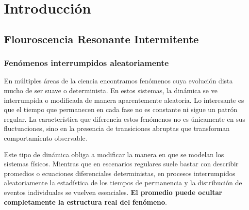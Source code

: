 \documentclass[11pt]{report}
\begin{document}


\clearpage %


\clearpage %



\clearpage %
\tableofcontents

\clearpage %
\listoffigures
{} %

\clearpage %
\listoftables
{} %

\clearpage
\printnomenclature
{} %




\chapter{Introducción}
\section{Flouroscencia Resonante Intermitente}
\subsection{Fenómenos interrumpidos aleatoriamente}

En múltiples áreas de la ciencia encontramos fenómenos cuya evolución dista mucho de ser suave o determinista. En estos sistemas, la dinámica se ve interrumpida o modificada de manera aparentemente aleatoria. Lo interesante es que el tiempo que permanecen en cada fase no es constante ni sigue un patrón regular. La característica que diferencia estos fenómenos no es únicamente en sus fluctuaciones, sino en la presencia de transiciones abruptas que transforman comportamiento observable.

Este tipo de dinámica obliga a modificar la manera en que se modelan los sistemas físicos. Mientras que en escenarios regulares suele bastar con describir promedios o ecuaciones diferenciales deterministas, en procesos interrumpidos aleatoriamente la estadística de los tiempos de permanencia y la distribución de eventos individuales se vuelven esenciales. \textbf{El promedio puede ocultar completamente la estructura real del fenómeno}.
\end{document}
